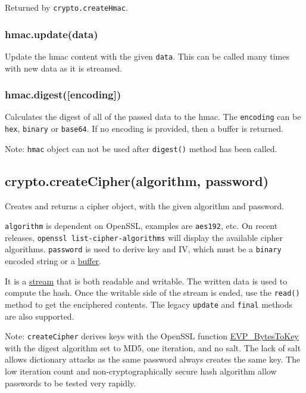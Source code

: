 Returned by \texttt{crypto.createHmac}.

\subsubsection{hmac.update(data)}\label{hmac.updatedata}

Update the hmac content with the given \texttt{data}. This can be called
many times with new data as it is streamed.

\subsubsection{hmac.digest({[}encoding{]})}\label{hmac.digestencoding}

Calculates the digest of all of the passed data to the hmac. The
\texttt{encoding} can be
\texttt{\textquotesingle{}hex\textquotesingle{}},
\texttt{\textquotesingle{}binary\textquotesingle{}} or
\texttt{\textquotesingle{}base64\textquotesingle{}}. If no encoding is
provided, then a buffer is returned.

Note: \texttt{hmac} object can not be used after \texttt{digest()}
method has been called.

\subsection{crypto.createCipher(algorithm,
password)}\label{crypto.createcipheralgorithm-password}

Creates and returns a cipher object, with the given algorithm and
password.

\texttt{algorithm} is dependent on OpenSSL, examples are
\texttt{\textquotesingle{}aes192\textquotesingle{}}, etc. On recent
releases, \texttt{openssl\ list-cipher-algorithms} will display the
available cipher algorithms. \texttt{password} is used to derive key and
IV, which must be a \texttt{\textquotesingle{}binary\textquotesingle{}}
encoded string or a \href{buffer.html}{buffer}.

It is a \href{stream.html}{stream} that is both readable and writable.
The written data is used to compute the hash. Once the writable side of
the stream is ended, use the \texttt{read()} method to get the
enciphered contents. The legacy \texttt{update} and \texttt{final}
methods are also supported.

Note: \texttt{createCipher} derives keys with the OpenSSL function
\href{https://www.openssl.org/docs/crypto/EVP_BytesToKey.html}{EVP\_BytesToKey}
with the digest algorithm set to MD5, one iteration, and no salt. The
lack of salt allows dictionary attacks as the same password always
creates the same key. The low iteration count and non-cryptographically
secure hash algorithm allow passwords to be tested very rapidly.

